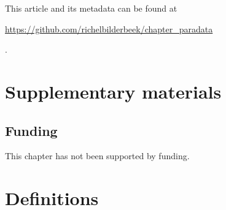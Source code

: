 This article and its metadata can be found at 
\begin{sloppypar}\url{https://github.com/richelbilderbeek/chapter_paradata}\end{sloppypar}.




\newpage
\appendix
\section{Supplementary materials}

\renewcommand{\thefigure}{S\arabic{figure}}
\setcounter{figure}{0}

\renewcommand{\thetable}{S\arabic{table}}
\setcounter{table}{0}

\subsection{Funding}

This chapter has not been supported by funding.

\section*{Definitions}


